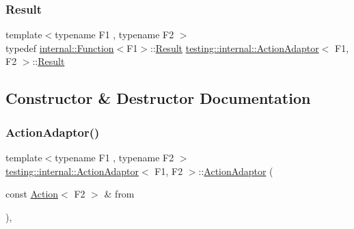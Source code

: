 \mbox{\label{classtesting_1_1internal_1_1_action_adaptor_afa8f7872b6db3d8f1545fd98b45b0b95}} 
\subsubsection{\texorpdfstring{Result}{Result}}
{\footnotesize\ttfamily template$<$typename F1 , typename F2 $>$ \\
typedef \mbox{\hyperlink{structtesting_1_1internal_1_1_function}{internal\+::\+Function}}$<$F1$>$\+::\mbox{\hyperlink{classtesting_1_1internal_1_1_action_adaptor_afa8f7872b6db3d8f1545fd98b45b0b95}{Result}} \mbox{\hyperlink{classtesting_1_1internal_1_1_action_adaptor}{testing\+::internal\+::\+Action\+Adaptor}}$<$ F1, F2 $>$\+::\mbox{\hyperlink{classtesting_1_1internal_1_1_action_adaptor_afa8f7872b6db3d8f1545fd98b45b0b95}{Result}}}



\subsection{Constructor \& Destructor Documentation}
\mbox{\label{classtesting_1_1internal_1_1_action_adaptor_a24ba3330ef3cc365b956c50ec73e4177}} 
\subsubsection{\texorpdfstring{ActionAdaptor()}{ActionAdaptor()}}
{\footnotesize\ttfamily template$<$typename F1 , typename F2 $>$ \\
\mbox{\hyperlink{classtesting_1_1internal_1_1_action_adaptor}{testing\+::internal\+::\+Action\+Adaptor}}$<$ F1, F2 $>$\+::\mbox{\hyperlink{classtesting_1_1internal_1_1_action_adaptor}{Action\+Adaptor}} (\begin{DoxyParamCaption}\item[{const \mbox{\hyperlink{classtesting_1_1_action}{Action}}$<$ F2 $>$ \&}]{from }\end{DoxyParamCaption})\hspace{0.3cm}{\ttfamily [inline]}, {\ttfamily [explicit]}}



